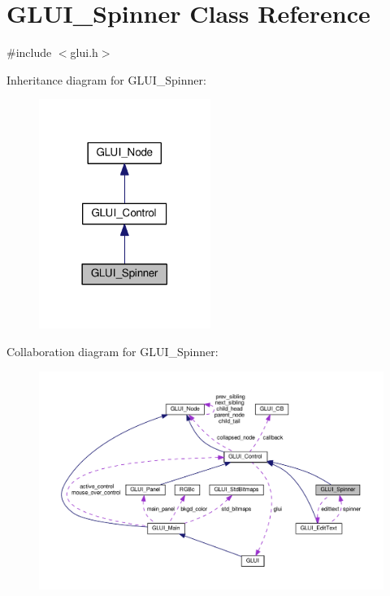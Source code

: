 \hypertarget{class_g_l_u_i___spinner}{\section{G\+L\+U\+I\+\_\+\+Spinner Class Reference}
\label{class_g_l_u_i___spinner}
}


{\ttfamily \#include $<$glui.\+h$>$}



Inheritance diagram for G\+L\+U\+I\+\_\+\+Spinner\+:\nopagebreak
\begin{figure}[H]
\begin{center}
\leavevmode
\includegraphics[width=158pt]{class_g_l_u_i___spinner__inherit__graph}
\end{center}
\end{figure}


Collaboration diagram for G\+L\+U\+I\+\_\+\+Spinner\+:\nopagebreak
\begin{figure}[H]
\begin{center}
\leavevmode
\includegraphics[width=350pt]{class_g_l_u_i___spinner__coll__graph}
\end{center}
\end{figure}
